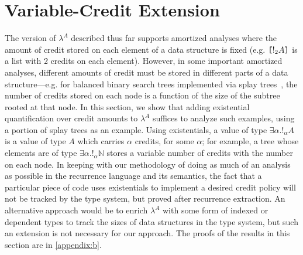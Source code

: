 \section{Variable-Credit Extension}
\label{sec:ex}

The version of $\lambda^A$ described thus far supports amortized analyses
where the amount of credit stored on each element of a data structure is
fixed (e.g. $\texttt{[}!_2 A\texttt{]}$ is a list with 2 credits on each element).
However, in some important amortized analyses, different amounts of credit
must be stored in different parts of a data structure---e.g. for balanced
binary search trees implemented via splay trees~\cite{sleator-tarjan-85},
the number of credits stored on each node is a function of the size of the
subtree rooted at that node.  In this section, we show that adding
existential quantification over credit amounts to $\lambda^A$ suffices to
analyze such examples, using a portion of splay trees as an example.  Using
existentials, a value of type $\exists \alpha.!_\alpha A$ is a value of type
$A$ which carries $\alpha$ credits, for some $\alpha$; for example, a tree
whose elements are of type $\exists \alpha.!_\alpha \mathbb{N}$ stores a
variable number of credits with the number on each node. In keeping with our
methodology of doing as much of an analysis as possible in the recurrence
language and its semantics, the fact that a particular piece of code uses
existentials to implement a desired credit policy will not be tracked by the
type system, but proved after recurrence extraction.  An alternative
approach would be to enrich $\lambda^A$ with some form of indexed or
dependent types to track the sizes of data structures in the type system,
but such an extension is not necessary for our approach.  
The proofs of the results in this section
are in \autoref{appendix:b}.%


